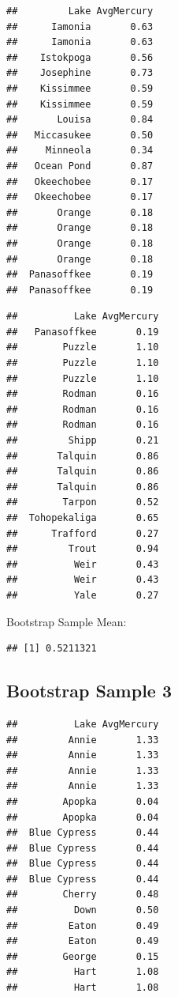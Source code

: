 \documentclass[]{book}
\newenvironment{Shaded}{\begin{snugshade}}{\end{snugshade}}
\newcommand{\KeywordTok}[1]{\textcolor[rgb]{0.13,0.29,0.53}{\textbf{#1}}}
\newcommand{\OperatorTok}[1]{\textcolor[rgb]{0.81,0.36,0.00}{\textbf{#1}}}
\newcommand{\NormalTok}[1]{#1}
\begin{document}
\begin{verbatim}
##         Lake AvgMercury
##      Iamonia       0.63
##      Iamonia       0.63
##    Istokpoga       0.56
##    Josephine       0.73
##    Kissimmee       0.59
##    Kissimmee       0.59
##       Louisa       0.84
##   Miccasukee       0.50
##     Minneola       0.34
##   Ocean Pond       0.87
##   Okeechobee       0.17
##   Okeechobee       0.17
##       Orange       0.18
##       Orange       0.18
##       Orange       0.18
##       Orange       0.18
##  Panasoffkee       0.19
##  Panasoffkee       0.19
\end{verbatim}

\begin{verbatim}
##          Lake AvgMercury
##   Panasoffkee       0.19
##        Puzzle       1.10
##        Puzzle       1.10
##        Puzzle       1.10
##        Rodman       0.16
##        Rodman       0.16
##        Rodman       0.16
##         Shipp       0.21
##       Talquin       0.86
##       Talquin       0.86
##       Talquin       0.86
##        Tarpon       0.52
##  Tohopekaliga       0.65
##      Trafford       0.27
##         Trout       0.94
##          Weir       0.43
##          Weir       0.43
##          Yale       0.27
\end{verbatim}

Bootstrap Sample Mean:

\begin{Shaded}
\end{Shaded}

\begin{verbatim}
## [1] 0.5211321
\end{verbatim}

\subsection{Bootstrap Sample 3}\label{bootstrap-sample-3}

\begin{verbatim}
##          Lake AvgMercury
##         Annie       1.33
##         Annie       1.33
##         Annie       1.33
##         Annie       1.33
##        Apopka       0.04
##        Apopka       0.04
##  Blue Cypress       0.44
##  Blue Cypress       0.44
##  Blue Cypress       0.44
##  Blue Cypress       0.44
##        Cherry       0.48
##          Down       0.50
##         Eaton       0.49
##         Eaton       0.49
##        George       0.15
##          Hart       1.08
##          Hart       1.08
\end{verbatim}
\end{document}
